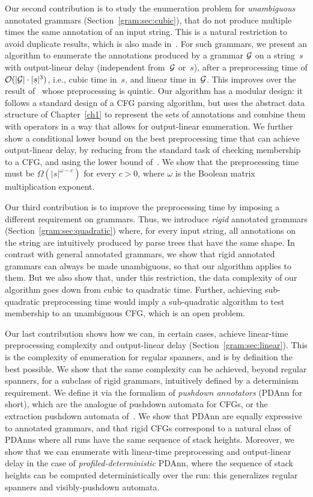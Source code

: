 Our second contribution is to study the enumeration problem for \emph{unambiguous} annotated grammars (Section~\ref{gram:sec:cubic}),
that do not produce multiple times the same annotation of an input string. This is a natural restriction to avoid duplicate results, %
which is also made in~\cite{Peterfreund21}. 
%
For such grammars, 
%
we present an algorithm to enumerate the annotations produced by a grammar $\mathcal{G}$ on a string~$s$ with output-linear delay (independent from~$\mathcal{G}$ or~$s$), after a preprocessing time of $\mathcal{O}(|\mathcal{G}| \cdot |s|^3)$, i.e., cubic time in~$s$, and linear time in~$\mathcal{G}$. 
%
This improves over the result of~\cite{Peterfreund21} whose preprocessing is quintic. 
Our algorithm has a modular design: it follows a standard design of a CFG
parsing algorithm, but uses the abstract data structure
of Chapter~\ref{ch1}
%
to represent
the sets of annotations and combine them with operators in a way that allows for output-linear enumeration. 
We further show a conditional lower bound on the best preprocessing time that can achieve output-linear delay, by reducing from the standard task of checking membership to a CFG, and using the lower bound of~\cite{AbboudBW18}. We show that the preprocessing time must be $\Omega(|s|^{\omega-c})$ for every $c > 0$, where $\omega$ is
%
the Boolean matrix multiplication exponent.

Our third contribution is to improve the preprocessing time by imposing a different requirement on grammars. Thus, we introduce \emph{rigid} annotated grammars (Section~\ref{gram:sec:quadratic}) where, for every input string, all annotations on the string are intuitively produced by parse trees that have the same shape. In contrast with general annotated grammars, we show that rigid annotated grammars can always be made unambiguous, so that our algorithm applies to them. But we also show that, under this restriction, the data complexity of our algorithm goes down from cubic to quadratic time.
%
Further, achieving sub-quadratic preprocessing time would imply a sub-quadratic algorithm to test membership to an unambiguous CFG, which is an open problem.
%

%
%

Our last contribution shows how we can, in certain cases, achieve linear-time preprocessing complexity and output-linear delay (Section~\ref{gram:sec:linear}). This is the complexity of enumeration for regular spanners, and is by definition the best possible. We show that the same complexity can be achieved, beyond regular spanners, for a subclass of rigid grammars, intuitively defined by a determinism requirement. We define it via the formalism of \emph{pushdown annotators} (PDAnn for short), which are the analogue of pushdown automata for CFGs, or the extraction pushdown automata of~\cite{Peterfreund21}. We show that PDAnn are equally expressive to annotated grammars, and that rigid CFGs correspond to a natural class of PDAnns where all runs have the same sequence of stack heights. Moreover, 
we show that we can enumerate with linear-time preprocessing and output-linear delay in the case of \emph{profiled-deterministic} PDAnn, where the sequence of stack heights can be computed deterministically over the run: this generalizes regular spanners and visibly-pushdown automata.

